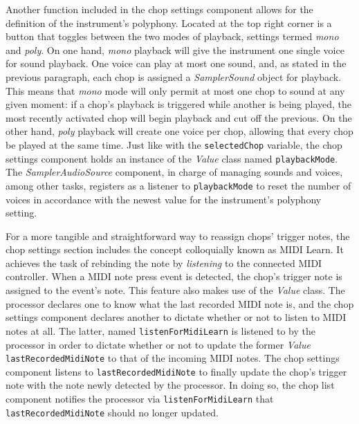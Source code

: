 \documentclass[12pt, a4paper, hidelinks]{report}
\begin{document}
	Another function included in the chop settings component allows for the definition of the instrument's polyphony. Located at the top right corner is a button that toggles between the two modes of playback, settings termed \textit{mono} and \textit{poly}. On one hand, \textit{mono} playback will give the instrument one single voice for sound playback. One voice can play at most one sound, and, as stated in the previous paragraph, each chop is assigned a \textit{SamplerSound} object for playback. This means that \textit{mono} mode will only permit at most one chop to sound at any given moment: if a chop's playback is triggered while another is being played, the most recently activated chop will begin playback and cut off the previous. On the other hand, \textit{poly} playback will create one voice per chop, allowing that every chop be played at the same time. Just like with the \texttt{selectedChop} variable, the chop settings component holds an instance of the \textit{Value} class named \texttt{playbackMode}. The \textit{SamplerAudioSource} component, in charge of managing sounds and voices, among other tasks, registers as a listener to \texttt{playbackMode} to reset the number of voices in accordance with the newest value for the instrument's polyphony setting.\par
	
	For a more tangible and straightforward way to reassign chops' trigger notes, the chop settings section includes the concept colloquially known as MIDI Learn. It achieves the task of rebinding the note by \textit{listening} to the connected MIDI controller. When a MIDI note press event is detected, the chop's trigger note is assigned to the event's note. This feature also makes use of the \textit{Value} class.  The processor declares one to know what the last recorded MIDI note is, and the chop settings component declares another to dictate whether or not to listen to MIDI notes at all. The latter, named \texttt{listenForMidiLearn} is listened to by the processor in order to dictate whether or not to update the former \textit{Value} \texttt{lastRecordedMidiNote} to that of the incoming MIDI notes. The chop settings component listens to \texttt{lastRecordedMidiNote} to finally update the chop's trigger note with the note newly detected by the processor. In doing so, the chop list component notifies the processor via \texttt{listenForMidiLearn} that \texttt{lastRecordedMidiNote} should no longer updated.
	
	
\end{document}
